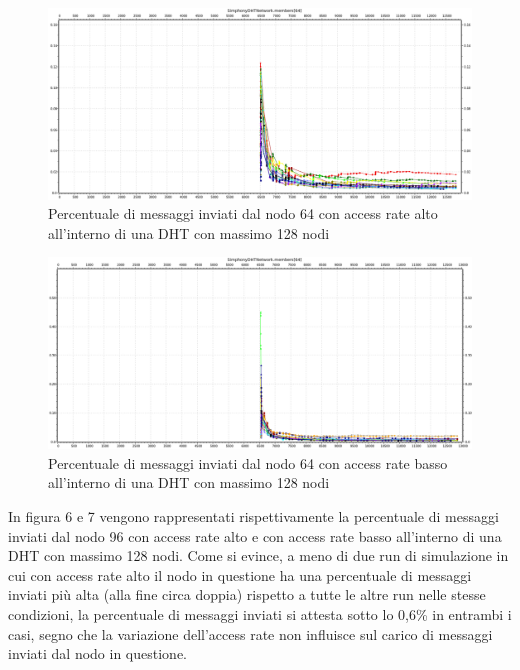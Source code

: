 \documentclass[	
	DIV=calc,
	paper=a4,
	fontsize=11pt,
	onecolumn
]{scrartcl} %
\begin{document}
	\begin{figure}[H]
		\centering
		\includegraphics[scale=0.35]	{SymphonyDHT/plots/PercentageOfMessagesSent/128_Nodes_FastAccess/SymphonyDHT_128Nodes_FastAccess_Node64.png}
		\caption{Percentuale di messaggi inviati dal nodo 64 con access rate alto all'interno di una DHT con massimo 128 nodi}
		\label{Figura 4}
	\end{figure}
	\begin{figure}[H]
		\centering
		\includegraphics[scale=0.35]	{SymphonyDHT/plots/PercentageOfMessagesSent/128_Nodes_SlowAccess/SymphonyDHT_128Nodes_SlowAccess_Node64.png}
		\caption{Percentuale di messaggi inviati dal nodo 64 con access rate basso all'interno di una DHT con massimo 128 nodi}
		\label{Figura 5}
	\end{figure}
	
	In figura 6 e 7 vengono rappresentati rispettivamente la percentuale di messaggi inviati dal nodo 96 con access rate alto e con access rate basso all'interno di una DHT con massimo 128 nodi. Come si evince, a meno di due run di simulazione in cui con access rate alto il nodo in questione ha una percentuale di messaggi inviati più alta (alla fine circa doppia) rispetto a tutte le altre run nelle stesse condizioni, la percentuale di messaggi inviati si attesta sotto lo 0,6\% in entrambi i casi, segno che la variazione dell'access rate non influisce sul carico di messaggi inviati dal nodo in questione.	
	
\end{document}
